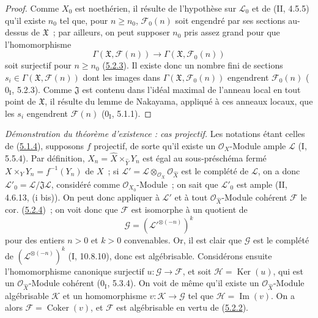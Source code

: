 \begin{proof}
Comme $X_0$ est noethérien, il résulte de l'hypothèse sur $\mathcal L_0$ et de
(II, 4.5.5) qu'il existe $n_0$ tel que, pour $n\geq n_0$, $\mathcal F_0(n)$ soit
engendré par ses sections au-dessus de $\mathfrak X$~; par ailleurs, on peut supposer
$n_0$ pris assez grand pour que l'homomorphisme
\[
\Gamma(\mathfrak X,\mathcal F(n))\longrightarrow
\Gamma(\mathfrak X,\mathcal F_0(n))
\]
soit surjectif pour $n\geq n_0$ (\hyperref[III.5.2.3-fr]{5.2.3}). Il existe donc
un nombre fini de sections $s_i\in\Gamma(\mathfrak X,\mathcal F(n))$ dont les
images dans $\Gamma(\mathfrak X,\mathcal F_0(n))$ engendrent $\mathcal F_0(n)$
($0_{\mathrm I}$, 5.2.3). Comme $\mathfrak J$ est contenu dans l'idéal maximal de
l'anneau local en tout point de $\mathfrak X$, il résulte du lemme de Nakayama,
appliqué à ces anneaux locaux, que les $s_i$ engendrent $\mathcal F(n)$
($0_{\mathrm I}$, 5.1.1).
\end{proof}

\begin{env}[5.2.5]
\label{III.5.2.5-fr}
\emph{Démonstration du théorème d'existence : cas projectif.}
Les notations étant celles de (\hyperref[III.5.1.4-fr]{5.1.4}), supposons $f$
projectif, de sorte qu'il existe un $\mathcal O_X$-Module ample $\mathcal L$
(I, 5.5.4). Par définition, $X_n=\widehat X\times_{\widehat Y}Y_n$ est égal au
sous-préschéma fermé $X\times_Y Y_n=f^{-1}(Y_n)$ de $X$~; si
$\mathcal L'=\mathcal L\otimes_{\mathcal O_X}\mathcal O_{\widehat X}$ est le
complété de $\mathcal L$, on a donc
$\mathcal L'_0=\mathcal L/\mathfrak J\mathcal L$, considéré comme
$\mathcal O_{X_0}$-Module~; on sait que $\mathcal L'_0$ est ample
(II, 4.6.13, (i bis)). On peut donc appliquer à $\mathcal L'$ et à tout
$\mathcal O_{\widehat X}$-Module cohérent $\mathcal F$ le cor.
(\hyperref[III.5.2.4-fr]{5.2.4})~; on voit donc que $\mathcal F$ est isomorphe à
un quotient de
\[
\mathcal G=(\mathcal L'^{\otimes(-n)})^k
\]
pour des entiers $n>0$ et $k>0$ convenables. Or, il est clair que $\mathcal G$ est
le complété de $(\mathcal L^{\otimes(-n)})^k$ (I, 10.8.10), donc est
algébrisable. Considérons ensuite l'homomorphisme canonique surjectif
$u:\mathcal G\to\mathcal F$, et soit $\mathcal H=\operatorname{Ker}(u)$, qui est
un $\mathcal O_{\widehat X}$-Module cohérent ($0_{\mathrm I}$, 5.3.4). On voit de
même qu'il existe un $\mathcal O_{\widehat X}$-Module algébrisable $\mathcal K$ et
un homomorphisme $v:\mathcal K\to\mathcal G$ tel que
$\mathcal H=\operatorname{Im}(v)$. On a alors
$\mathcal F=\operatorname{Coker}(v)$, et $\mathcal F$ est algébrisable en vertu de
(\hyperref[III.5.2.2-fr]{5.2.2}).
\end{env}

